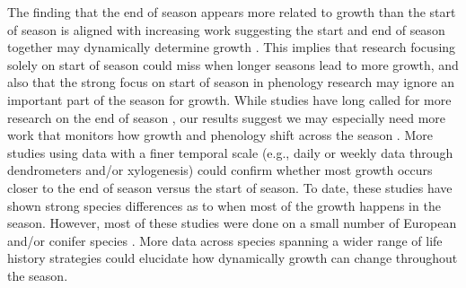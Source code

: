 The finding that the end of season appears more related to growth than the start of season is aligned with increasing work suggesting the start and end of season together may dynamically determine growth \citep{zohner_effect_2023}. This implies that research focusing solely on start of season \citep{dow_warm_2022,gaoEarlierStartThermal2022,wheeler_snow_2016} could miss when longer seasons lead to more growth, and also that the strong focus on start of season in phenology research may ignore an important part of the season for growth. While studies have long called for more research on the end of season \citep{gallinat_autumn_2015,gunderson_forest_2012,piao_plant_2019,richardson_terrestrial_2012}, our results suggest we may especially need more work that monitors how growth and phenology shift across the season \citep{zani_increased_2020,zohner_effect_2023}. More studies using data with a finer temporal scale (e.g., daily or weekly data through dendrometers and/or xylogenesis) could confirm whether most growth occurs closer to the end of season versus the start of season. To date, these studies have shown strong species differences as to when most of the growth happens in the season. However, most of these studies were done on a small number of European and/or conifer species \citep[e.g.][]{zweifel_are_2016,etzold_number_2022,balducci_stem_2019}. More data across species spanning a wider range of life history strategies could elucidate how dynamically growth can change throughout the season.


